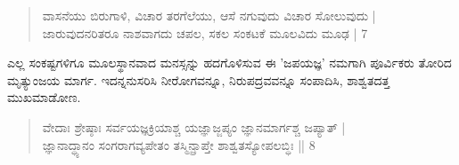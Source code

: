 \begin{verse}
ವಾಸನೆಯು ಬಿರುಗಾಳಿ, ವಿಚಾರ ತರಗೆಲೆಯು, ಆಸೆ ನಗುವುದು ವಿಚಾರ ಸೋಲುವುದು |\\
ಜಾರುವುದನರಿತರೂ ನಾಶವಾಗದು ಚಪಲ, ಸಕಲ ಸಂಕಟಕೆ ಮೂಲವಿದು ಮೂಢ | 7
\end{verse}
ಎಲ್ಲ ಸಂಕಷ್ಟಗಳಿಗೂ ಮೂಲಸ್ಥಾನವಾದ ಮನಸ್ಸನ್ನು ಹದಗೊಳಿಸುವ ಈ ’ಜಪಯಜ್ಞ’ ನಮಗಾಗಿ ಪೂರ್ವಿಕರು ತೋರಿದ ಮೃತ್ಯುಂಜಯ ಮಾರ್ಗ. ಇದನ್ನನುಸರಿಸಿ ನೀರೋಗವನ್ನೂ, ನಿರುಪದ್ರವವನ್ನೂ ಸಂಪಾದಿಸಿ, ಶಾಶ್ವತದತ್ತ ಮುಖಮಾಡೋಣ.
\begin{verse}	
ವೇದಾಃ ಶ್ರೇಷ್ಠಾಃ ಸರ್ವಯಜ್ಞಕ್ರಿಯಾಶ್ಚ ಯಜ್ಞಾಜ್ಜಪ್ಯಂ ಜ್ಞಾನಮಾರ್ಗಶ್ಚ ಜಪ್ಯಾತ್ |\\
ಜ್ಞಾನಾದ್ಧ್ಯಾನಂ ಸಂಗರಾಗವ್ಯಪೇತಂ ತಸ್ಮಿನ್ಪ್ರಾಪ್ತೇ ಶಾಶ್ವತಸ್ಯೋಪಲಬ್ಧಿಃ || 8
\end{verse}	


